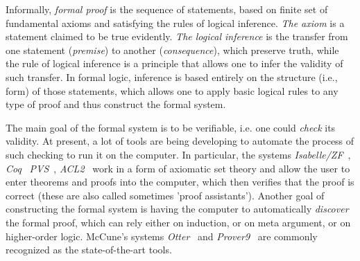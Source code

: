 \documentclass[article]{aaltoseries}
\begin{document}

Informally, \textit{formal proof} is the sequence of statements, based on finite set of fundamental axioms and satisfying the rules of logical inference. \textit{The axiom} is a statement claimed to be true evidently. \textit{The logical inference} is the transfer from one statement (\textit{premise}) to another (\textit{consequence}), which preserve truth, while the rule of logical inference is a principle that allows one to infer the validity of such transfer. 
In formal logic, inference is based entirely on the structure (i.e., form) of those statements, which allows one to apply basic logical rules to any type of proof and thus construct the formal system.

The main goal of the formal system is to be verifiable, i.e. one could \textit{check} its validity. At present, a lot of tools are being developing to automate the process of such checking to run it on the computer. In particular, the systems \textit{Isabelle/ZF}~\cite{tool_Isabelle}, \textit{Coq}~\cite{tool_Coq} \textit{PVS}~\cite{tool_Pvs}, \textit{ACL2}~\cite{tool_Acl} work in a form of axiomatic set theory and allow the user to enter theorems and proofs into the computer, which then verifies that the proof is correct (these are also called sometimes 'proof assistants').
Another goal of constructing the formal system is having the computer to automatically \textit{discover} the formal proof, which can rely either on induction, or on meta argument, or on higher-order logic. McCune’s systems \textit{Otter}~\cite{tool_Otter} and \textit{Prover9}~\cite{tool_Prover9} are commonly recognized as the state-of-the-art tools.
\end{document}
